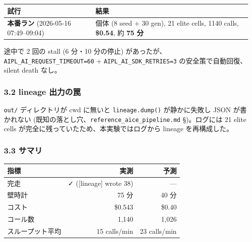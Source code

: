 \documentclass[
]{ltjsarticle}
\newcounter{none} %
\begin{document}
{\def\LTcaptype{none} %
\begin{longtable}[]{@{}
  >{\raggedright\arraybackslash}p{}
  >{\raggedright\arraybackslash}p{}@{}}
\toprule\noalign{}
\begin{minipage}[b]{\linewidth}\raggedright
試行
\end{minipage} & \begin{minipage}[b]{\linewidth}\raggedright
結果
\end{minipage} \\
\midrule\noalign{}
\endhead
\bottomrule\noalign{}
\endlastfoot
\textbf{本番ラン} (2026-05-16 07:49--09:04) & 38 個体 (8 seed + 30 gen),
21 elite cells, 1140 calls, \textbf{\$0.54}, 約 \textbf{75 分} \\
\end{longtable}
}

途中で 2 回の stall (6 分・10 分の停止)
があったが、\texttt{AIPL\_AI\_REQUEST\_TIMEOUT=60} +
\texttt{AIPL\_AI\_SDK\_RETRIES=3} の安全策で自動回復、silent death
なし。

\subsubsection{3.2 lineage
出力の罠}\label{lineage-ux51faux529bux306eux7f60}

\texttt{out/} ディレクトリが cwd に無いと \texttt{lineage.dump()}
が静かに失敗し JSON が書かれない
(既知の落とし穴、\texttt{reference\_aice\_pipeline.md} §)。ログには 21
elite cells が完全に残っていたため、本実験ではログから lineage
を再構成した。

\subsubsection{3.3 サマリ}\label{ux30b5ux30deux30ea}

{\def\LTcaptype{none} %
\begin{longtable}[]{@{}lrr@{}}
\toprule\noalign{}
指標 & 実測 & 予測 \\
\midrule\noalign{}
\endhead
\bottomrule\noalign{}
\endlastfoot
完走 & ✓ ({[}lineage{]} wrote 38) & --- \\
壁時計 & 75 分 & 40 分 \\
コスト & \$0.543 & \$0.40 \\
コール数 & 1,140 & 1,026 \\
スループット平均 & 15 calls/min & 23 calls/min \\
\end{longtable}
}
\end{document}
